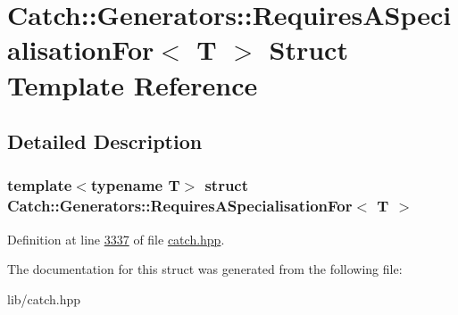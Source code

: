 \hypertarget{structCatch_1_1Generators_1_1RequiresASpecialisationFor}{}\section{Catch\+::Generators\+::Requires\+A\+Specialisation\+For$<$ T $>$ Struct Template Reference}
\label{structCatch_1_1Generators_1_1RequiresASpecialisationFor}


\subsection{Detailed Description}
\subsubsection*{template$<$typename T$>$\newline
struct Catch\+::\+Generators\+::\+Requires\+A\+Specialisation\+For$<$ T $>$}



Definition at line \mbox{\hyperlink{catch_8hpp_source_l03337}{3337}} of file \mbox{\hyperlink{catch_8hpp_source}{catch.\+hpp}}.



The documentation for this struct was generated from the following file\+:\begin{DoxyCompactItemize}
\item 
lib/catch.\+hpp\end{DoxyCompactItemize}

